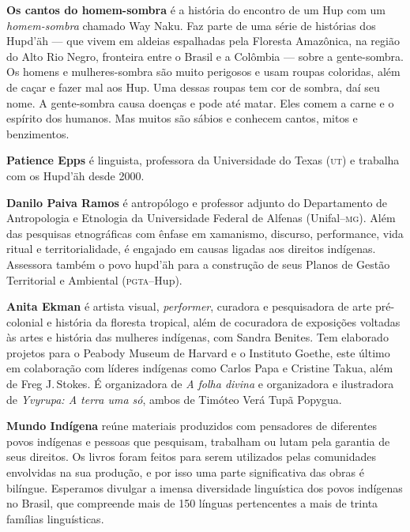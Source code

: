 \textbf{Os cantos do homem-sombra} é a história do encontro de um Hup com um \textit{homem-sombra} chamado Way Naku. Faz parte de uma série de histórias dos Hupd'äh --- que vivem em aldeias espalhadas pela Floresta Amazônica, na região do Alto Rio Negro, fronteira entre o Brasil e a Colômbia --- sobre a gente-sombra. Os homens e mulheres-sombra são muito perigosos e usam roupas coloridas, além de caçar e fazer mal aos Hup. Uma dessas roupas tem cor de sombra, daí seu nome. A gente-sombra causa doenças e pode até matar. Eles comem a carne e o espírito dos humanos. Mas muitos são sábios e conhecem cantos, mitos e benzimentos.

\textbf{Patience Epps} é linguista, professora da Universidade do Texas \textsc{(ut)} e trabalha com os Hupd'äh desde 2000.

\textbf{Danilo Paiva Ramos} é antropólogo e professor adjunto do Departamento de Antropologia e Etnologia da Universidade Federal de Alfenas (Unifal--\textsc{mg}). Além das pesquisas etnográficas com ênfase em xamanismo, discurso, performance, vida ritual e territorialidade, é engajado em causas ligadas aos direitos indígenas. Assessora também o povo hupd'äh para a construção de seus Planos de Gestão Territorial e Ambiental (\textsc{pgta}--Hup).

\textbf{Anita Ekman} é artista visual, \textit{performer}, curadora e
 pesquisadora de arte pré-colonial e história da floresta tropical, além de
 cocuradora de exposições voltadas às artes e história das mulheres
 indígenas, com Sandra Benites. Tem elaborado projetos para o Peabody Museum
 de Harvard e o Instituto Goethe, este último em colaboração com líderes
 indígenas como Carlos Papa e Cristine Takua, além de Freg J.\,Stokes. É
 organizadora de \textit{A folha divina} e organizadora e ilustradora
 de \textit{Yvyrupa: A terra uma só}, ambos de Timóteo Verá Tupã Popygua.

\textbf{Mundo Indígena} reúne materiais produzidos com pensadores de diferentes povos indígenas e pessoas que pesquisam, trabalham ou lutam pela garantia de seus direitos. Os livros foram feitos para serem utilizados pelas comunidades envolvidas na sua produção, e por isso uma parte significativa das obras é bilíngue. Esperamos divulgar a imensa diversidade linguística dos povos indígenas no Brasil, que compreende mais de 150 línguas pertencentes a mais de trinta famílias linguísticas.

